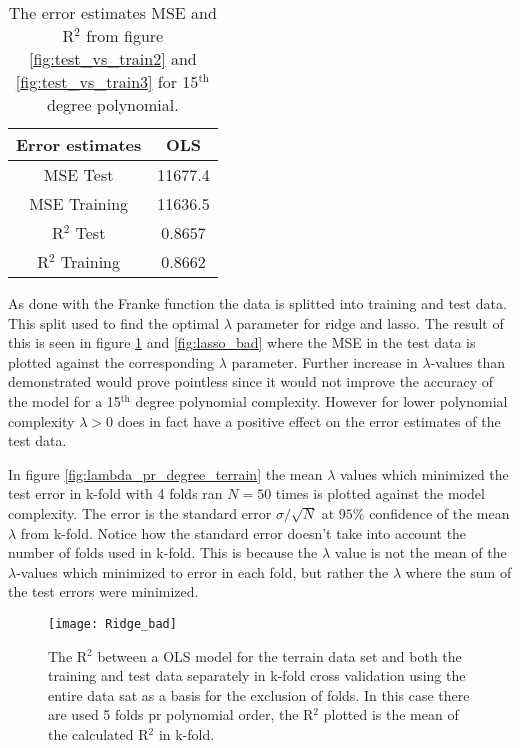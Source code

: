 \documentclass[uio,jmp,amsmath,amssymb,reprint,nofootinbib]{revtex4-1}
\numberwithin{equation}{section}
\begin{document}
\begin{table}
\begin{tabular}{|c|c|}\hline
Error estimates & OLS\\ \hline
MSE Test & 11677.4 \\ \hline
MSE Training & 11636.5 \\ \hline
R\(^2\) Test & 0.8657 \\ \hline
R\(^2\) Training & 0.8662 \\ \hline
\end{tabular}
\caption{The error estimates MSE and R\(^2\) from figure \ref{fig:test_vs_train2} and \ref{fig:test_vs_train3} for 15\(^\text{th}\) degree polynomial.}
\label{tab:09}
\end{table}

As done with the Franke function the data is splitted into training and test data. This split used to find the optimal \(\lambda\) parameter for ridge and lasso. The result of this is seen in figure \ref{fig:ridge_bad} and \ref{fig:lasso_bad} where the MSE in the test data is plotted against the corresponding \(\lambda\) parameter. Further increase in \(\lambda\)-values than demonstrated would prove pointless since it would not improve the accuracy of the model for a 15\(^\text{th}\) degree polynomial complexity. However for lower polynomial complexity \(\lambda > 0\) does in fact have a positive effect on the error estimates of the test data. 

In figure \ref{fig:lambda_pr_degree_terrain} the mean \(\lambda\) values which minimized the test error in k-fold with 4 folds ran \(N=50\) times is plotted against the model complexity. The error is the standard error \(\sigma/\sqrt{N}\) at \(95\%\) confidence of the mean \(\lambda\) from k-fold. Notice how the standard error doesn't take into account the number of folds used in k-fold. This is because the \(\lambda\) value is not the mean of the \(\lambda\)-values which minimized to error in each fold, but rather the \(\lambda\) where the sum of the test errors were minimized.


\begin{figure}[H]
    \centering
    \texttt{[image: Ridge\_bad]}
    \caption{The R\(^2\) between a OLS model for the terrain data set and both the training and test data separately in k-fold cross validation using the entire data sat as a basis for the exclusion of folds. In this case there are used 5 folds pr polynomial order, the R\(^2\) plotted is the mean of the calculated R\(^2\) in k-fold.}
    \label{fig:ridge_bad}
\end{figure}
\end{document}
